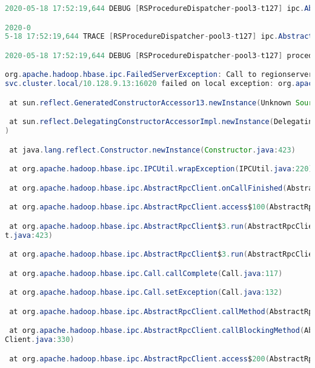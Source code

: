 \documentclass{report}%
\begin{document}
\begin{enumerate}
\begin{lstlisting}[language=java]
2020-05-18 17:52:19,644 DEBUG [RSProcedureDispatcher-pool3-t127] ipc.AbstractRpcClient: Not trying to connect to regionserver-1.hbase.hbase.svc.cluster.local/10.128.9.13:16020 this server is in the failed servers list

2020-0
5-18 17:52:19,644 TRACE [RSProcedureDispatcher-pool3-t127] ipc.AbstractRpcClient: Call: ExecuteProcedures, callTime: 0ms

2020-05-18 17:52:19,644 DEBUG [RSProcedureDispatcher-pool3-t127] procedure.RSProcedureDispatcher: request to regionserver-1.hbase.hbase.svc.cluster.local,16020,1589824187906 failed, try=1474

org.apache.hadoop.hbase.ipc.FailedServerException: Call to regionserver-1.hbase.hbase.
svc.cluster.local/10.128.9.13:16020 failed on local exception: org.apache.hadoop.hbase.ipc.FailedServerException: This server is in the failed servers list: regionserver-1.hbase.hbase.svc.cluster.local/10.128.9.13:16020

 at sun.reflect.GeneratedConstructorAccessor13.newInstance(Unknown Source)

 at sun.reflect.DelegatingConstructorAccessorImpl.newInstance(DelegatingConstructorAccessorImpl.java:45
)

 at java.lang.reflect.Constructor.newInstance(Constructor.java:423)

 at org.apache.hadoop.hbase.ipc.IPCUtil.wrapException(IPCUtil.java:220)

 at org.apache.hadoop.hbase.ipc.AbstractRpcClient.onCallFinished(AbstractRpcClient.java:392)

 at org.apache.hadoop.hbase.ipc.AbstractRpcClient.access$100(AbstractRpcClient.java:97)

 at org.apache.hadoop.hbase.ipc.AbstractRpcClient$3.run(AbstractRpcClien
t.java:423)

 at org.apache.hadoop.hbase.ipc.AbstractRpcClient$3.run(AbstractRpcClient.java:419)

 at org.apache.hadoop.hbase.ipc.Call.callComplete(Call.java:117)

 at org.apache.hadoop.hbase.ipc.Call.setException(Call.java:132)

 at org.apache.hadoop.hbase.ipc.AbstractRpcClient.callMethod(AbstractRpcClient.java:436)

 at org.apache.hadoop.hbase.ipc.AbstractRpcClient.callBlockingMethod(AbstractRpc
Client.java:330)

 at org.apache.hadoop.hbase.ipc.AbstractRpcClient.access$200(AbstractRpcClient.java:97)


\end{lstlisting}
\end{enumerate}
\end{document}
